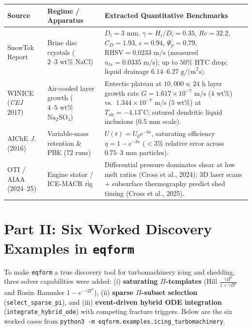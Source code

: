 \documentclass[11pt,a4paper]{article}
\begin{document}
\begin{center}
\renewcommand{\arraystretch}{1.2}
\footnotesize
\begin{tabularx}{\textwidth}{@{}l l X@{}}
\toprule
\textbf{Source} & \textbf{Regime / Apparatus} & \textbf{Extracted Quantitative Benchmarks} \\
\midrule
SnowTek Report & Brine disc crystals ($2\text{--}3\text{ wt\%}$ NaCl) & $D_i = 3\text{ mm}$, $\gamma = H_i/D_i = 0.35$, $Re = 32.2$, $C_D = 1.93$, $\epsilon = 0.94$, $\Psi_p = 0.79$, $\text{RHSV} = 0.0233\text{ m/s}$ (measured $u_{tx} = 0.0335\text{ m/s}$); up to $50\%$ HTC drop; liquid drainage $6.14\text{--}6.27\text{ g/(m}^2\text{s)}$. \\
WINICE (\emph{CEJ} 2017) & Air-cooled layer growth ($4\text{--}5\text{ wt\%}$ $\text{Na}_2\text{SO}_4$) & Eutectic plateau at $10{,}000\text{ s}$; $24\text{ h}$ layer growth rate $G = 1.617\times 10^{-7}\text{ m/s}$ ($4\text{ wt\%}$) vs.\ $1.344\times 10^{-7}\text{ m/s}$ ($5\text{ wt\%}$) at $T_{\text{air}} = -4.13^\circ\text{C}$; sutured dendritic liquid inclusions ($0.5\text{ mm}$ scale). \\
AIChE \emph{J.} (2016) & Variable-mass retention \& PBE ($72$ runs) & $U(t) = U_0 e^{-bv}$, saturating efficiency $\eta = 1 - e^{-bv}$ ($<3\%$ relative error across $0.75\text{--}3\text{ mm}$ particles). \\
OTI / AIAA (2024--25) & Engine stator / ICE-MACR rig & Differential pressure dominates shear at low melt ratios (Cross et al., 2024); 3D laser scans + subsurface thermography predict shed timing (Cross et al., 2025). \\
\bottomrule
\end{tabularx}
\end{center}

\newpage
\section{Part II: Six Worked Discovery Examples in \texttt{eqform}}

To make \texttt{eqform} a true discovery tool for turbomachinery icing and shedding, three solver capabilities were added: (i) \textbf{saturating $\Pi$-templates} (Hill $\frac{\gamma\Pi^\nu}{1+\gamma\Pi^\nu}$ and Rosin--Rammler $1 - e^{-\gamma\Pi^\nu}$), (ii) \textbf{sparse $\Pi$-subset selection} (\texttt{select\_sparse\_pi}), and (iii) \textbf{event-driven hybrid ODE integration} (\texttt{integrate\_hybrid\_ode}) with competing fracture triggers. Below are the six worked cases from \texttt{python3 -m eqform.examples.icing\_turbomachinery}.
\end{document}
